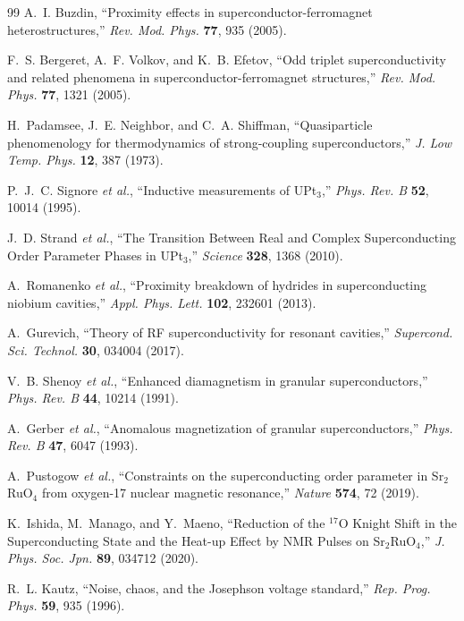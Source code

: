 \documentclass[aps,prb,twocolumn,superscriptaddress,floatfix,nofootinbib,longbibliography]{revtex4-2}
\begin{document}
\begin{thebibliography}{99}
A.~I. Buzdin, ``Proximity effects in superconductor-ferromagnet
heterostructures,'' \textit{Rev. Mod. Phys.} \textbf{77}, 935 (2005).

F.~S. Bergeret, A.~F. Volkov, and K.~B. Efetov, ``Odd triplet
superconductivity and related phenomena in superconductor-ferromagnet
structures,'' \textit{Rev. Mod. Phys.} \textbf{77}, 1321 (2005).

H.~Padamsee, J.~E. Neighbor, and C.~A. Shiffman, ``Quasiparticle
phenomenology for thermodynamics of strong-coupling superconductors,''
\textit{J. Low Temp. Phys.} \textbf{12}, 387 (1973).

P.~J.~C. Signore \textit{et al.}, ``Inductive measurements of
UPt$_3$,'' \textit{Phys. Rev. B} \textbf{52}, 10014 (1995).

J.~D. Strand \textit{et al.}, ``The Transition Between Real and Complex
Superconducting Order Parameter Phases in UPt$_3$,'' \textit{Science}
\textbf{328}, 1368 (2010).

A.~Romanenko \textit{et al.}, ``Proximity breakdown of hydrides in
superconducting niobium cavities,'' \textit{Appl. Phys. Lett.}
\textbf{102}, 232601 (2013).

A.~Gurevich, ``Theory of RF superconductivity for resonant cavities,''
\textit{Supercond. Sci. Technol.} \textbf{30}, 034004 (2017).

V.~B. Shenoy \textit{et al.}, ``Enhanced diamagnetism in granular
superconductors,'' \textit{Phys. Rev. B} \textbf{44}, 10214 (1991).

A.~Gerber \textit{et al.}, ``Anomalous magnetization of granular
superconductors,'' \textit{Phys. Rev. B} \textbf{47}, 6047 (1993).

A.~Pustogow \textit{et al.}, ``Constraints on the superconducting order
parameter in Sr$_2$RuO$_4$ from oxygen-17 nuclear magnetic resonance,''
\textit{Nature} \textbf{574}, 72 (2019).

K.~Ishida, M.~Manago, and Y.~Maeno, ``Reduction of the $^{17}$O Knight
Shift in the Superconducting State and the Heat-up Effect by NMR Pulses
on Sr$_2$RuO$_4$,'' \textit{J. Phys. Soc. Jpn.} \textbf{89}, 034712 (2020).

R.~L. Kautz, ``Noise, chaos, and the Josephson voltage standard,''
\textit{Rep. Prog. Phys.} \textbf{59}, 935 (1996).


\end{thebibliography}
\end{document}
